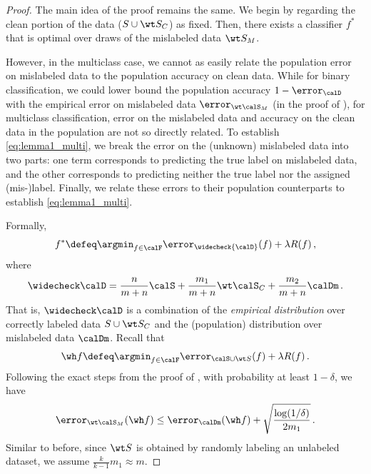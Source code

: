 \begin{proof}
   
    The main idea of the proof remains the same.
    We begin by regarding the clean portion of the data 
    ($S \cup \wt S_C$) as fixed. 
    Then, there exists a classifier $f^*$ 
    that is optimal over draws 
    of the mislabeled data $\wt S_M$. 
    
    However, in the multiclass case,
    we cannot as easily relate the population error on mislabeled data 
    to the population accuracy on clean data.   
    While for binary classification, 
    we could lower bound the population accuracy $1-\error_\calD$
    with the empirical error on mislabeled data $\error_{\wt \calS_M}$ 
    (in the proof of ), 
    for multiclass classification, 
    error on the mislabeled data 
    and accuracy on the clean data 
    in the population 
    are not so directly related.  
    To establish \eqref{eq:lemma1_multi},
    we break the error on the 
    (unknown) mislabeled data 
    into two parts: one term corresponds 
    to predicting the true label on mislabeled data, 
    and the other corresponds to predicting 
    neither the true label 
    nor the assigned (mis-)label.  
    Finally, we relate these errors to their
    population counterparts to establish \eqref{eq:lemma1_multi}. 
    
    Formally, 
    \begin{align}
    f^* \defeq \argmin_{f \in \calF} \error_{\widecheck {\calD}} (f)  + \lambda R(f) \,, \label{eq:modified_ERM_reg2}
    \end{align}
    where $$\widecheck \calD = \frac{n}{m+n} \calS + \frac{m_1}{m+n} \wt \calS_C  + \frac{m_2}{m+n}\calDm \,.$$ 
    That is, $\widecheck \calD$ is a combination 
    of the \emph{empirical distribution} 
    over correctly labeled data $S \cup \wt S_C$
    and the (population) distribution 
    over mislabeled data $\calDm$.
    Recall that 
    \begin{align}
    \wh f \defeq \argmin_{f \in \calF} \error_{\calS \cup \wt S} (f) + \lambda R(f) \,. \label{eq:orig_ERM_reg2}
    \end{align}
    Following the exact steps from the proof of , 
    with probability at least $1-\delta$, we have  
    \begin{align}
        \error_{ \wt \calS_M}(\wh f) \le \error_{\calDm}(\wh f) + \sqrt{\frac{\log(1/\delta)}{2 m_1}} \,. \label{eq:lemma1_final_multi_prev}
    \end{align}
    Similar to before, since $\wt S$ is obtained 
    by randomly labeling an unlabeled dataset, 
    we assume 
    $\frac{k}{k-1} m_1 \approx m$. 
    

\end{proof}
